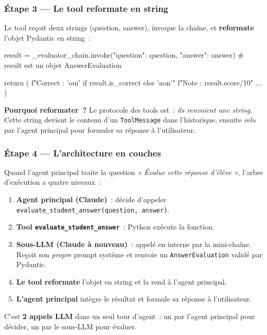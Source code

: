 \documentclass[11pt,a4paper]{article}
\begin{document}
\subsubsection*{Étape 3 — Le tool reformate en string}

Le tool reçoit deux strings (question, answer), invoque la chaîne, et
\textbf{reformate} l'objet Pydantic en string~:

\begin{pythoncode}
result = _evaluator_chain.invoke({"question": question, "answer": answer})
# result est un objet AnswerEvaluation

return (
    f"Correct : {'oui' if result.is_correct else 'non'}\n"
    f"Note : {result.score}/10\n"
    ...
)
\end{pythoncode}

\textbf{Pourquoi reformater~?} Le protocole des tools est~: \emph{ils
renvoient une string}. Cette string devient le contenu d'un
\texttt{ToolMessage} dans l'historique, ensuite \emph{relu} par l'agent
principal pour formuler sa réponse à l'utilisateur.

\subsubsection*{Étape 4 — L'architecture en couches}

Quand l'agent principal traite la question \emph{« Évalue cette réponse
d'élève »}, l'arbre d'exécution a quatre niveaux~:

\begin{enumerate}[leftmargin=*]
  \item \textbf{Agent principal (Claude)}~: décide d'appeler
        \texttt{evaluate\_student\_answer(question, answer)}.
  \item \textbf{Tool \texttt{evaluate\_student\_answer}}~: Python exécute
        la fonction.
  \item \textbf{Sous-LLM (Claude à nouveau)}~: appelé en interne par
        la mini-chaîne. Reçoit son \emph{propre} prompt système et
        renvoie un \texttt{AnswerEvaluation} validé par Pydantic.
  \item \textbf{Le tool reformate} l'objet en string et la rend à
        l'agent principal.
  \item \textbf{L'agent principal} intègre le résultat et formule sa
        réponse à l'utilisateur.
\end{enumerate}

C'est \textbf{2 appels LLM} dans un seul tour d'agent~: un par
l'agent principal pour décider, un par le sous-LLM pour évaluer.
\end{document}
